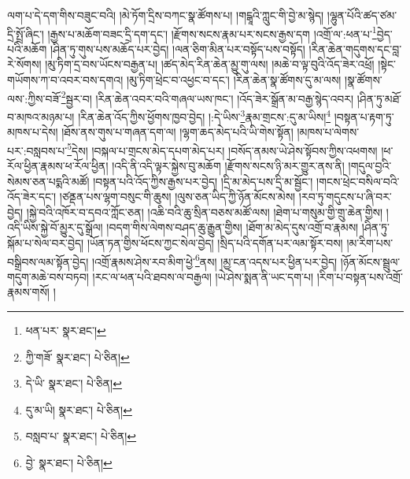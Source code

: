 ལག་པ་དེ་དག་གིས་བཟུང་བའི། །མེ་ཏོག་དྲིས་བཀང་སྣ་ཚོགས་པ། །གངྒཱའི་ཀླུང་གི་བྱེ་མ་སྙེད། །ལྷུན་པོའི་ཚད་ཙམ་དྲི་སྤྲོ་ཞིང་། །རྒྱས་པ་མཆོག་བཟང་དྲི་དག་དང་། །རྫོགས་སངས་རྣམ་པར་སངས་རྒྱས་དག །འགྲོ་ལ་:ཕན་པ་\footnote{ཕན་པར་  སྣར་ཐང་། }བྱེད་པའི་མཆོག །ཤིན་ཏུ་གུས་པས་མཆོད་པར་བྱེད། །ལན་ཅིག་མིན་པར་བསྟོད་པས་བསྟོད། །རིན་ཆེན་གདུགས་དང་བླ་རེ་སོགས། །མུ་ཏིག་དྲ་བས་ཡོངས་བརྒྱན་པ། །ཚད་མེད་རིན་ཆེན་མྱུ་གུ་ལས། །མཆེ་བ་ལྟ་བུའི་འོད་ཟེར་འཕྲོ། །སྟེང་གཡོགས་ཀ་བ་འབར་བས་དགའ། །མུ་ཏིག་ཕྲེང་བ་འཕྱང་བ་དང་། །རིན་ཆེན་སྣ་ཚོགས་དུ་མ་ལས། །སྣ་ཚོགས་ལས་:ཀྱིས་བཟོ་\footnote{ཀྱི་གཟོ་  སྣར་ཐང་།  པེ་ཅིན། }སྦྱར་བ། །རིན་ཆེན་འབར་བའི་གཞལ་ཡས་ཁང་། །འོད་ཟེར་སྒྲོན་མ་བརྒྱ་སྙེད་འབར། །ཤིན་ཏུ་མཐོ་བ་མཁའ་མཉམ་པ། །རིན་ཆེན་འོད་ཀྱིས་ཕྱོགས་ཁྱབ་བྱེད། །:དེ་ཡིས་\footnote{དེ་ཡི་  སྣར་ཐང་།  པེ་ཅིན། }རྣམ་གྲངས་:དུ་མ་ཡིས།\footnote{དུ་མ་ཡི།  སྣར་ཐང་།  པེ་ཅིན། } །བསྟན་པ་རྟག་ཏུ་མཁས་པ་དེས། །ཐོས་ནས་གུས་པ་གཞན་དག་ལ། །ལྷག་ཆད་མེད་པའི་ཡི་གེས་སྟོན། །མཁས་པ་ལེགས་པར་:བསླབས་པ་\footnote{བསླབ་པ་  སྣར་ཐང་།  པེ་ཅིན། }དེས། །བསྐལ་པ་གྲངས་མེད་དཔག་མེད་པར། །བསོད་ནམས་ཡེ་ཤེས་སྟོབས་ཀྱིས་འཕགས། །ཕ་རོལ་ཕྱིན་རྣམས་ཕ་རོལ་ཕྱིན། །འདི་ནི་འདི་ལྟར་སྐྱེས་བུ་མཆོག །རྫོགས་སངས་ཉི་མར་གྱུར་ནས་ནི། །གདུལ་བྱའི་སེམས་ཅན་པདྨའི་མཚོ། །བསྟན་པའི་འོད་ཀྱིས་རྒྱས་པར་བྱེད། །དྲི་མ་མེད་པས་དྲི་མ་སྦྱོང་། །གངས་ཕྲེང་བསིལ་བའི་འོད་ཟེར་དང་། །ཙནྡན་པས་ལྷག་བསུང་གི་ཆུས། །ལུས་ཅན་ཡིད་ཀྱི་ཉོན་མོངས་མེས། །རབ་ཏུ་གདུངས་པ་ཞི་བར་བྱེད། །སྐྱེ་བའི་འཁོར་བ་དབའ་ཀློང་ཅན། །འཆི་བའི་ཆུ་སྲིན་བཅས་མཚོ་ལས། །ཐེག་པ་གསུམ་གྱི་གྲུ་ཆེན་གྱིས། །འདི་ཡིས་སྐྱེ་བོ་མྱུར་དུ་སྒྲོལ། །བདག་གིས་ལེགས་བཤད་ཆུ་རྒྱུན་གྱིས། །ཐོག་མ་མེད་དུས་འགྲོ་བ་རྣམས། །ཤིན་ཏུ་སྐོམ་པ་སེལ་བར་བྱེད། །ཡོན་ཏན་གྱིས་ཕོངས་ཀྱང་སེལ་བྱེད། །སྲིད་པའི་དགོན་པར་ལམ་སྟོར་བས། །མ་རིག་པས་བསྒྲིབས་ལམ་སྟོན་བྱེད། །འགྲོ་རྣམས་ཤེས་རབ་མིག་ཕྱེ་\footnote{བྱེ་  སྣར་ཐང་།  པེ་ཅིན། }ནས། །མྱ་ངན་འདས་པར་ཕྱིན་པར་བྱེད། །ཉོན་མོངས་སྦྲུལ་གདུག་མཆེ་བས་བཏབ། །རང་ལ་ཕན་པའི་ཐབས་ལ་བརྒྱལ། །ཡེ་ཤེས་སྨན་ནི་ཡང་དག་པ། །རིག་པ་བསྟན་པས་འགྲོ་རྣམས་གསོ། །
